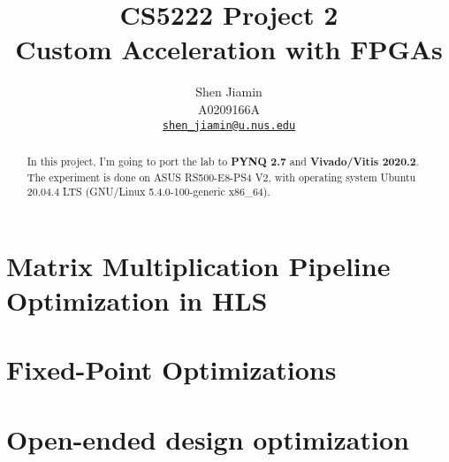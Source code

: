 \documentclass{article}
\begin{document}
\title{\bfseries
  CS5222 Project 2 \\
  Custom Acceleration with FPGAs\\
}

\author{
  Shen Jiamin \\
  A0209166A \\
  \href{mailto:shen_jiamin@u.nus.edu}{\nolinkurl{shen_jiamin@u.nus.edu}}
}

\maketitle

\begin{abstract}
  In this project, I'm going to port the lab to \textbf{PYNQ 2.7} and \textbf{Vivado/Vitis 2020.2}.
  The experiment is done on ASUS RS500-E8-PS4 V2, with operating system
  Ubuntu 20.04.4 LTS (GNU/Linux 5.4.0-100-generic x86\_64).
\end{abstract}


\section{Matrix Multiplication Pipeline Optimization in HLS}









\clearpage
\section{Fixed-Point Optimizations}




\clearpage
\section{Open-ended design optimization}



% 
% 

\clearpage
\appendix
\end{document}
